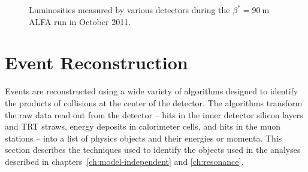 \begin{figure}[h]
	\centering
	\caption{Luminosities measured by various detectors during the $\beta^{*}=90~\mbox{m}$ ALFA run in October 2011.}
	\label{fig:reco-luminosity-alfa}
\end{figure}



\section{Event Reconstruction}\label{sec:event-reconstruction}
Events are reconstructed using a wide variety of algorithms designed to identify the products of collisions at the center of the detector. The algorithms transform the raw data read out from the detector -- hits in the inner detector silicon layers and TRT straws, energy deposits in calorimeter cells, and hits in the muon stations -- into a list of physics objects and their energies or momenta. This section describes the techniques used to identify the objects used in the analyses described in chapters~\ref{ch:model-independent} and \ref{ch:resonance}. 


